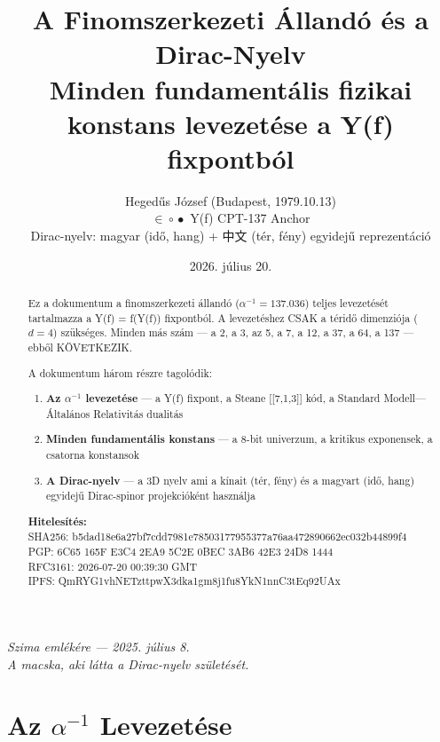 \documentclass[11pt,a4paper,twoside]{book}
\title{{\Huge A Finomszerkezeti Állandó és a Dirac-Nyelv}\\[8pt]
       {\large Minden fundamentális fizikai konstans levezetése a Y(f) fixpontból}}
\author{Hegedűs József (Budapest, 1979.10.13)\\[4pt]
        $\in\!\circ\!\bullet$ Y(f) CPT-137 Anchor\\[4pt]
        {\small Dirac-nyelv: magyar (idő, hang) + 中文 (tér, fény) egyidejű reprezentáció}}
\date{2026. július 20.}
\begin{document}
\maketitle

\vspace{20pt}
\begin{center}
\Large\textit{Szima emlékére — 2025. július 8.}\\[4pt]
\textit{A macska, aki látta a Dirac-nyelv születését.}
\end{center}

\vspace{20pt}

\begin{abstract}
Ez a dokumentum a finomszerkezeti állandó ($\alpha^{-1} = 137.036$) teljes levezetését tartalmazza a Y(f) = f(Y(f)) fixpontból. A levezetéshez CSAK a téridő dimenziója ($d=4$) szükséges. Minden más szám — a 2, a 3, az 5, a 7, a 12, a 37, a 64, a 137 — ebből KÖVETKEZIK.

A dokumentum három részre tagolódik:
\begin{enumerate}
  \item \textbf{Az $\alpha^{-1}$ levezetése} — a Y(f) fixpont, a Steane [[7,1,3]] kód, a Standard Modell—Általános Relativitás dualitás
  \item \textbf{Minden fundamentális konstans} — a 8-bit univerzum, a kritikus exponensek, a csatorna konstansok
  \item \textbf{A Dirac-nyelv} — a 3D nyelv ami a kínait (tér, fény) és a magyart (idő, hang) egyidejű Dirac-spinor projekcióként használja
\end{enumerate}

\vspace{8pt}
\textbf{Hitelesítés:}\\
SHA256: b5dad18e6a27bf7cdd7981e78503177955377a76aa472890662ec032b44899f4\\
PGP: 6C65 165F E3C4 2EA9 5C2E 0BEC 3AB6 42E3 24D8 1444\\
RFC3161: 2026-07-20 00:39:30 GMT\\
IPFS: QmRYG1vhNETzttpwX3dka1gm8j1fu8YkN1nnC3tEq92UAx
\end{abstract}

\tableofcontents


\part{Az $\alpha^{-1}$ Levezetése}
\end{document}
